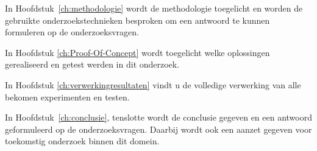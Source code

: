 In Hoofdstuk~\ref{ch:methodologie} wordt de methodologie toegelicht en worden de gebruikte onderzoekstechnieken besproken om een antwoord te kunnen formuleren op de onderzoeksvragen.

In Hoofdstuk \ref{ch:Proof-Of-Concept} wordt toegelicht welke oplossingen gerealiseerd en getest werden in dit onderzoek.

In Hoofdstuk \ref{ch:verwerkingresultaten} vindt u de volledige verwerking van alle bekomen experimenten en testen.

In Hoofdstuk~\ref{ch:conclusie}, tenslotte wordt de conclusie gegeven en een antwoord geformuleerd op de onderzoeksvragen. Daarbij wordt ook een aanzet gegeven voor toekomstig onderzoek binnen dit domein.

